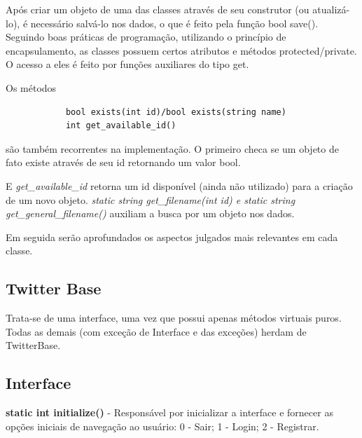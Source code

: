 \documentclass[a4paper]{article}
\begin{document}
Após criar um objeto de uma das classes através de seu construtor (ou atualizá-lo), é necessário salvá-lo nos dados, o que é feito pela função bool save().
Seguindo boas práticas de programação, utilizando o princípio de encapsulamento, as classes possuem certos atributos e métodos protected/private. O acesso a eles é feito por funções auxiliares do tipo get.

Os métodos
            \begin{lstlisting}
            bool exists(int id)/bool exists(string name)
            int get_available_id()
            \end{lstlisting}

são também recorrentes na implementação. O primeiro checa se um objeto de fato existe através de seu id retornando um valor bool.

E \textit{get\_available\_id} retorna um id disponível (ainda não utilizado) para a criação de um novo objeto. \textit{static string get\_filename(int id) e static string get\_general\_filename()} auxiliam a busca por um objeto nos dados.

Em seguida serão aprofundados os aspectos julgados mais relevantes em cada classe.




\subsection{Twitter Base}

Trata-se de uma interface, uma vez que possui apenas métodos virtuais puros. Todas as demais (com exceção de Interface e das exceções) herdam de TwitterBase.

\subsection{Interface}

\textbf{static int initialize()} - Responsável por inicializar a interface e fornecer as opções iniciais de navegação ao usuário: 0 - Sair; 1 - Login; 2 - Registrar.
\end{document}
